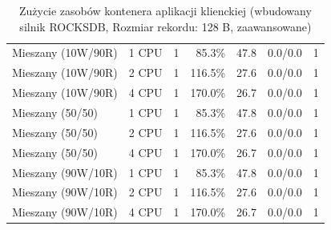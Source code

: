 \begin{table}[ht]
{\begin{tabular}{llcrrcc}
Mieszany (10W/90R) & 1 CPU & 1 & 85.3\% & 47.8 & 0.0/0.0 & 1 \\
Mieszany (10W/90R) & 2 CPU & 1 & 116.5\% & 27.6 & 0.0/0.0 & 1 \\
Mieszany (10W/90R) & 4 CPU & 1 & 170.0\% & 26.7 & 0.0/0.0 & 1 \\
Mieszany (50/50) & 1 CPU & 1 & 85.3\% & 47.8 & 0.0/0.0 & 1 \\
Mieszany (50/50) & 2 CPU & 1 & 116.5\% & 27.6 & 0.0/0.0 & 1 \\
Mieszany (50/50) & 4 CPU & 1 & 170.0\% & 26.7 & 0.0/0.0 & 1 \\
Mieszany (90W/10R) & 1 CPU & 1 & 85.3\% & 47.8 & 0.0/0.0 & 1 \\
Mieszany (90W/10R) & 2 CPU & 1 & 116.5\% & 27.6 & 0.0/0.0 & 1 \\
Mieszany (90W/10R) & 4 CPU & 1 & 170.0\% & 26.7 & 0.0/0.0 & 1 \\
\bottomrule
\end{tabular}%
}
\caption{Zużycie zasobów kontenera aplikacji klienckiej (wbudowany silnik ROCKSDB, Rozmiar rekordu: 128 B, zaawansowane)}
\label{tab:resources_rocksdb_small_0}
\end{table}
